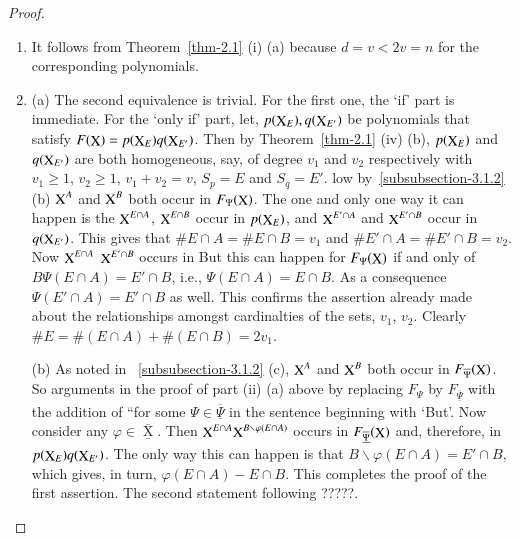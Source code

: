 \documentclass[a4paper,12pt]{article}
\DeclareMathOperator{\x}{\mathrm{X}}
\theoremstyle{definition}
\theoremstyle{underlinethm}
\theoremstyle{definition}
\begin{document}
\begin{proof}
\begin{enumerate}[label=(\roman*)]
 
 \item  It follows from Theorem~\ref{thm-2.1} (i) (a) because $d=v < 2 v =n$ for the corresponding polynomials. 

\item (a) The second equivalence is trivial. For the first one, the `if' part is immediate. For the  `only if' part, let, $p(\bold{\x}_{E}), q (\bold{\x}_{E'})$ be polynomials that satisfy $F(\bold{\x}) = p(\bold{\x}_{E}) q(\bold{\x}_{E'})$. Then by Theorem~\ref{thm-2.1} (iv) (b), $p(\bold{\x}_{E})$ and $q(\bold{\x}_{E'})$ are both homogeneous, say, of degree $v_{1}$ and $v_{2}$ respectively with $v_{1} \geq 1$, $v_{2} \geq 1$, $v_{1} + v_{2} = v$, $S_{p} =E$ and $S_{q} = E'$.  low by~\eqref{subsubsection-3.1.2} (b) $\bold{\x}^{A}$ and $\bold{\x}^{B}$ both occur in $F_{\Psi}(\bold{\x})$. The one and only one way it can happen is the $\bold{\x}^{E \cap A}$, $\bold{\x}^{E \cap B}$ occur in $p(\bold{\x}_{E})$, and $\bold{\x}^{E' \cap A}$ and $\bold{\x}^{E' \cap B}$ occur in $q(\bold{\x}_{E'})$. This gives that $\# E \cap A = \# E \cap B = v_{1}$ and $\# E' \cap A = \# E' \cap B =v_{2}$. Now $\bold{\x}^{E \cap A}$ $\bold{\x}^{E' \cap B}$ occurs in But this can happen for $F_{\Psi} (\bold{\x})$ if and only of $B \Psi(E \cap A) = E' \cap B$, i.e., $\Psi(E \cap A) = E \cap B$. As a consequence $\Psi (E' \cap A) = E' \cap B$ as well. This confirms the assertion already made about the relationships amongst cardinalties of the sets, $v_{1}$, $v_{2}$. Clearly $\# E = \# (E \cap A) + \# (E \cap B) = 2 v_{1}$.

(b) As noted in ~\ref{subsubsection-3.1.2} (c), $\bold{\x}^{A}$ and $\bold{\x}^{B}$ both occur in $F_{\overline{\Psi}}(\bold{\x})$. So arguments in the proof of part (ii) (a) above by replacing $F_{\Psi}$ by $F_{\underline{\overline{\Psi}}}$ with the addition of ``for some $\Psi \in \underline{\overline{\Psi}}$ in the sentence beginning with `But'. Now consider any $\varphi \in \underline{\overline{\x}}$. Then $\bold{\x}^{E \cap A} \bold{\x}^{B \smallsetminus \varphi (E \cap A)}$ occurs in $F_{\underline{\overline{\Psi}}}(\bold{\x})$ and, therefore, in $p(\bold{\x}_{E}) q(\bold{\x}_{E'})$. The only way this can happen is that $B \smallsetminus \varphi (E \cap A) = E' \cap B$, which gives, in turn, $\varphi(E \cap A) - E \cap B$. This completes the proof of the first assertion. The second statement following ?????.


\end{enumerate}
\end{proof}
\end{document}

